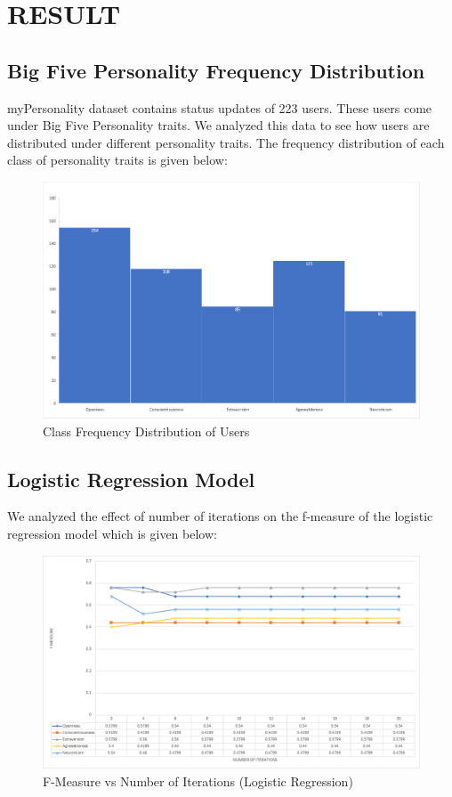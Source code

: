 \newpage
\section{RESULT}
\subsection{Big Five Personality Frequency Distribution}
myPersonality dataset contains status updates of 223 users. These users come under Big Five Personality traits. We analyzed this data to see how users are distributed under different personality traits. The frequency distribution of each class of personality traits is given below:
\begin{figure}[!ht]
\centering
\includegraphics[width = \textwidth ]{fig/class_frequency.png}
\caption{Class Frequency Distribution of Users}
\label{fig:class_frequency}
\end{figure}

\subsection{Logistic Regression Model}
We analyzed the effect of number of iterations on the f-measure of the logistic regression model which is given below:
\begin{figure}[!ht]
\centering
\includegraphics[width = \textwidth ]{fig/f-measure_logistic.png}
\caption{F-Measure vs Number of Iterations (Logistic Regression)}
\label{fig:f-measure_logistic}
\end{figure}


